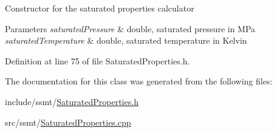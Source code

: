 Constructor for the saturated properties calculator 
\begin{DoxyParams}{Parameters}
{\em saturated\+Pressure} & double, saturated pressure in M\+Pa \\
\hline
{\em saturated\+Temperature} & double, saturated temperature in Kelvin \\
\hline
\end{DoxyParams}


Definition at line 75 of file Saturated\+Properties.\+h.



The documentation for this class was generated from the following files\+:\begin{DoxyCompactItemize}
\item 
include/ssmt/\hyperlink{_saturated_properties_8h}{Saturated\+Properties.\+h}\item 
src/ssmt/\hyperlink{_saturated_properties_8cpp}{Saturated\+Properties.\+cpp}\end{DoxyCompactItemize}
